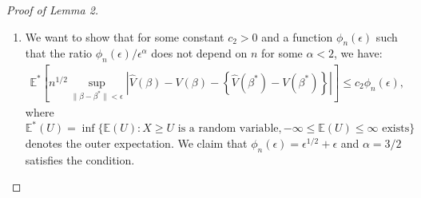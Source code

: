 \documentclass{article}
\newcommand{\wh}{\widehat}
\begin{document}
\begin{proof}[Proof of Lemma 2]
\begin{enumerate}
		\item[(ii)] We want to show that for some constant $c_2 > 0$ and a function $\phi_n(\epsilon)$ such that the ratio $\phi_n(\epsilon)/\epsilon^\alpha$ does not depend on $n$ for some $\alpha < 2$, we have:
		\begin{align}
			\mathbb E^*\left[ n^{1/2} \sup_{\|\beta - \beta^*\| < \epsilon} \left| \wh V(\beta) - V(\beta) - \left\{\wh V(\beta^*) - V(\beta^*)\right\} \right| \right] \le c_2\phi_n(\epsilon),\label{eq:centeredproc}
		\end{align}
		where $\mathbb E^*(U) = \inf\{ \mathbb E(U): X\ge U \text{ is a random variable}, -\infty \le \mathbb E(U) \le \infty \text{ exists} \}$ denotes the outer expectation.
		We claim that $\phi_n(\epsilon) = \epsilon^{1/2} + \epsilon$ and $\alpha=3/2$ satisfies the condition.
		

\end{enumerate}
\end{proof}
\end{document}
